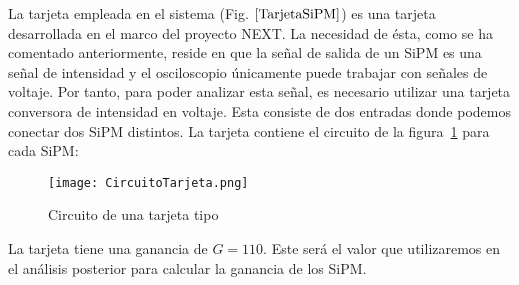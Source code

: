 La tarjeta empleada en el sistema (Fig. $\ref{TarjetaSiPM}$) es una tarjeta desarrollada en el marco del proyecto NEXT. La necesidad de ésta, como se ha comentado anteriormente, reside en que la señal de salida de un SiPM es una señal de intensidad y el osciloscopio únicamente puede trabajar con señales de voltaje. Por tanto, para poder analizar esta señal, es necesario utilizar una tarjeta conversora de intensidad en voltaje. Esta consiste de dos entradas donde podemos conectar dos SiPM distintos. La tarjeta contiene el circuito  de la figura~\ref{esquemacircuitotarjeta} para cada SiPM:

\begin{figure}[hbtp]
\centering
\texttt{[image: CircuitoTarjeta.png]}
\caption{Circuito de una tarjeta tipo~\cite{datasheet SiPM}\label{esquemacircuitotarjeta}}
\end{figure}
La tarjeta tiene una ganancia de $G=110$. Este será el valor que utilizaremos en el análisis posterior para calcular la ganancia de los SiPM.

